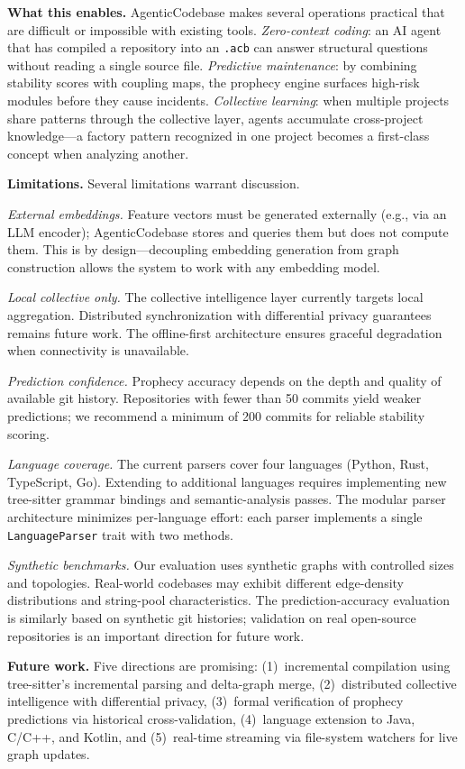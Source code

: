 \documentclass[10pt, twocolumn]{article}
\newcommand{\acbfile}{\texttt{.acb}\xspace}
\begin{document}
\textbf{What this enables.} AgenticCodebase makes several operations practical that are difficult or impossible with existing tools. \emph{Zero-context coding}: an AI agent that has compiled a repository into an \acbfile can answer structural questions without reading a single source file. \emph{Predictive maintenance}: by combining stability scores with coupling maps, the prophecy engine surfaces high-risk modules before they cause incidents. \emph{Collective learning}: when multiple projects share patterns through the collective layer, agents accumulate cross-project knowledge---a factory pattern recognized in one project becomes a first-class concept when analyzing another.

\textbf{Limitations.} Several limitations warrant discussion.

\emph{External embeddings.} Feature vectors must be generated externally (e.g., via an LLM encoder); AgenticCodebase stores and queries them but does not compute them. This is by design---decoupling embedding generation from graph construction allows the system to work with any embedding model.

\emph{Local collective only.} The collective intelligence layer currently targets local aggregation. Distributed synchronization with differential privacy guarantees remains future work. The offline-first architecture ensures graceful degradation when connectivity is unavailable.

\emph{Prediction confidence.} Prophecy accuracy depends on the depth and quality of available git history. Repositories with fewer than 50 commits yield weaker predictions; we recommend a minimum of 200 commits for reliable stability scoring.

\emph{Language coverage.} The current parsers cover four languages (Python, Rust, TypeScript, Go). Extending to additional languages requires implementing new tree-sitter grammar bindings and semantic-analysis passes. The modular parser architecture minimizes per-language effort: each parser implements a single \texttt{LanguageParser} trait with two methods.

\emph{Synthetic benchmarks.} Our evaluation uses synthetic graphs with controlled sizes and topologies. Real-world codebases may exhibit different edge-density distributions and string-pool characteristics. The prediction-accuracy evaluation is similarly based on synthetic git histories; validation on real open-source repositories is an important direction for future work.

\textbf{Future work.} Five directions are promising: (1)~incremental compilation using tree-sitter's incremental parsing and delta-graph merge, (2)~distributed collective intelligence with differential privacy, (3)~formal verification of prophecy predictions via historical cross-validation, (4)~language extension to Java, C/C++, and Kotlin, and (5)~real-time streaming via file-system watchers for live graph updates.
\end{document}
